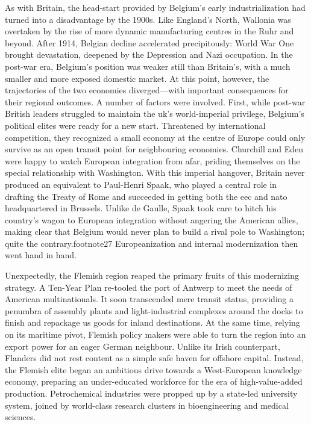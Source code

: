 \documentclass[
]{book}
\begin{document}
As with Britain, the head-start provided by Belgium's early industrialization had turned into a disadvantage by the 1900s. Like England's North, Wallonia was overtaken by the rise of more dynamic manufacturing centres in the Ruhr and beyond. After 1914, Belgian decline accelerated precipitously: World War One brought devastation, deepened by the Depression and Nazi occupation. In the post-war era, Belgium's position was weaker still than Britain's, with a much smaller and more exposed domestic market. At this point, however, the trajectories of the two economies diverged---with important consequences for their regional outcomes. A number of factors were involved. First, while post-war British leaders struggled to maintain the uk's world-imperial privilege, Belgium's political elites were ready for a new start. Threatened by international competition, they recognized a small economy at the centre of Europe could only survive as an open transit point for neighbouring economies. Churchill and Eden were happy to watch European integration from afar, priding themselves on the special relationship with Washington. With this imperial hangover, Britain never produced an equivalent to Paul-Henri Spaak, who played a central role in drafting the Treaty of Rome and succeeded in getting both the eec and nato headquartered in Brussels. Unlike de Gaulle, Spaak took care to hitch his country's wagon to European integration without angering the American allies, making clear that Belgium would never plan to build a rival pole to Washington; quite the contrary.footnote27 Europeanization and internal modernization then went hand in hand.

Unexpectedly, the Flemish region reaped the primary fruits of this modernizing strategy. A Ten-Year Plan re-tooled the port of Antwerp to meet the needs of American multinationals. It soon transcended mere transit status, providing a penumbra of assembly plants and light-industrial complexes around the docks to finish and repackage us goods for inland destinations. At the same time, relying on its maritime pivot, Flemish policy makers were able to turn the region into an export power for an eager German neighbour. Unlike its Irish counterpart, Flanders did not rest content as a simple safe haven for offshore capital. Instead, the Flemish elite began an ambitious drive towards a West-European knowledge economy, preparing an under-educated workforce for the era of high-value-added production. Petrochemical industries were propped up by a state-led university system, joined by world-class research clusters in bioengineering and medical sciences.
\end{document}
